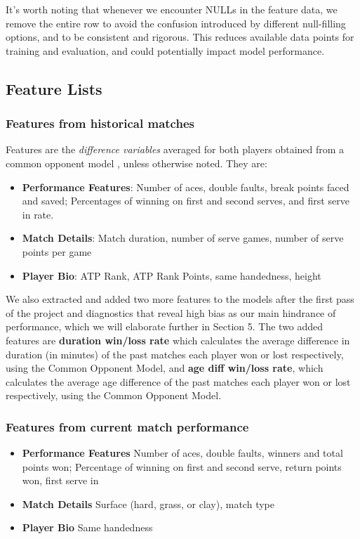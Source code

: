 \documentclass[paper=a4, fontsize=10pt]{scrartcl} %
\numberwithin{equation}{section} %
\numberwithin{figure}{section} %
\numberwithin{table}{section} %
\begin{document}
It's worth noting that whenever we encounter NULLs in the feature data, we remove the entire row to avoid the confusion introduced by different null-filling options, and to be consistent and rigorous. This reduces available data points for training and evaluation, and could potentially impact model performance. 
\subsection{Feature Lists}
\label{sec:feat}
\subsubsection{Features from historical matches}
Features are the \textit{difference variables} averaged for both players obtained from a common opponent model \cite{KNOTTENBELT20123820}, unless otherwise noted. They are:
\begin{itemize}
\item \textbf{Performance Features}: Number of aces, double faults, break points faced and saved; Percentages of winning on first and second serves, and first serve in rate.
\item \textbf{Match Details}: Match duration, number of serve games, number of serve points per game
\item \textbf{Player Bio}: ATP Rank, ATP Rank Points, same handedness, height
\end{itemize}
We also extracted and added two more features to the models after the first pass of the project and diagnostics that reveal high bias as our main hindrance of performance, which we will elaborate further in Section 5. The two added features are \textbf{duration win/loss rate} which calculates the average difference in duration (in minutes) of the past matches each player won or lost respectively, using the Common Opponent Model, and \textbf{age diff win/loss rate}, which calculates the average age difference of the past matches each player won or lost respectively, using the Common Opponent Model.
\subsubsection{Features from current match performance}
\begin{itemize}
\item \textbf{Performance Features} Number of aces, double faults, winners and total points won; Percentage of winning on first and second serve, return points won, first serve in
\item \textbf{Match Details} Surface (hard, grass, or clay), match type
\item \textbf{Player Bio} Same handedness
\end{itemize}
\end{document}
